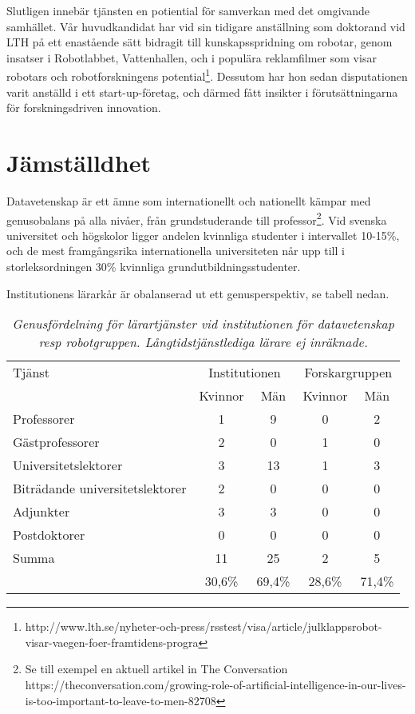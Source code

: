 \documentclass[11pt,a4paper]{article}
\begin{document}
Slutligen innebär tjänsten en potiential för samverkan med det omgivande samhället. Vår huvudkandidat har vid sin tidigare anställning som doktorand vid LTH på ett enastående sätt bidragit till kunskapsspridning om robotar, genom insatser i Robotlabbet, Vattenhallen, och i populära reklamfilmer som visar robotars och robotforskningens potential\footnote{http://www.lth.se/nyheter-och-press/rsstest/visa/article/julklappsrobot-visar-vaegen-foer-framtidens-progra}. Dessutom har hon sedan disputationen varit anställd i ett start-up-företag, och därmed fått insikter i förutsättningarna för forskningsdriven innovation. 

\section{Jämställdhet}
Datavetenskap är ett ämne som internationellt och nationellt kämpar med genusobalans på alla nivåer, från grundstuderande till professor\footnote{Se till exempel en aktuell artikel in The Conversation https://theconversation.com/growing-role-of-artificial-intelligence-in-our-lives-is-too-important-to-leave-to-men-82708}. Vid svenska universitet och högskolor ligger andelen kvinnliga studenter i intervallet 10-15\%, och de mest framgångsrika internationella universiteten når upp till i storleksordningen 30\% kvinnliga grundutbildningsstudenter.

Institutionens lärarkår är obalanserad ut ett genusperspektiv,  se tabell nedan. 

\begin{table}[h!]
\caption{\textit{Genusfördelning för lärartjänster vid institutionen för datavetenskap resp robotgruppen. Långtidstjänstlediga lärare ej inräknade.}}
\begin{center}
\begin{tabular}{ l |c|c|c|c|}
Tjänst	&	\multicolumn{2}{|c|}{Institutionen} & \multicolumn{2}{|c|}{Forskargruppen}\\
	&	Kvinnor	& Män	&	Kvinnor	& Män	\\
\hline
Professorer	&	1&	9&	0&	2\\
Gästprofessorer & 2 & 0 & 1 & 0 \\
Universitetslektorer&	3&	13&	1&	3\\
Biträdande universitetslektorer&	2\footnotemark&	0&	0&	0\\ 
Adjunkter  &	3&	3&	0&	0\\
Postdoktorer&	0&	0&	0&	0\\
\hline
Summa	& 11 & 25 & 2 & 5\\
 & 30,6\% & 69,4\%& 28,6\%&71,4\%\\
\end{tabular}
\end{center}
\label{table:genus}
\end{table}%
\end{document}
